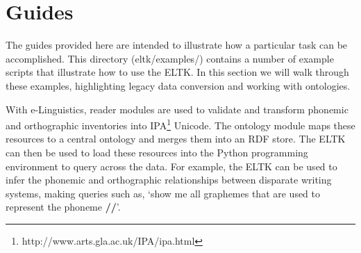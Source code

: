 \documentclass[]{article}
\begin{document}
\section{Guides} %


The guides provided here are intended to illustrate how a particular task can be accomplished. This directory (eltk/examples/) contains a number of example scripts that illustrate how to use the ELTK. In this section we will walk through these examples, highlighting legacy data conversion and working with ontologies.

With e-Linguistics, reader modules are used to validate and transform phonemic and orthographic inventories into IPA\footnote{http://www.arts.gla.ac.uk/IPA/ipa.html} Unicode. The ontology module maps these resources to a central ontology and merges them into an RDF store. The ELTK can then be used to load these resources into the Python programming environment to query across the data. For example, the ELTK can be used to infer the phonemic and orthographic relationships between disparate writing systems, making queries such as, `show me all graphemes that are used to represent the phoneme \textbf{//}'. 


\begin{comment}
Looks like a very good outline for the tutorial. So we can get somethikng to Dwight, and others, in a reasonable amount of time, I'd suggest you spend the rest of
your time on these sections only:

3.1 Working with ontologies

3.2 Legacy data conversion (but only  the following subsections)
-bibtex
-character conversions

This should get you comfortable with using the meat of the toolkit and prepare you for the Phoible work. I'll spend time on the rest. And, if you have time, you might
consider adding a section on installing on a Mac, which I think you did, right? I can cover the rest of Ubuntu8.

I think for most of section 1, we can just paste in our paper, and then add to it gradually.

Do you know the \verb{} command in Latex? It's a way to introduce small code snippets w/o having to use the full verbatim environment.

test

\end{comment}
\end{document}
